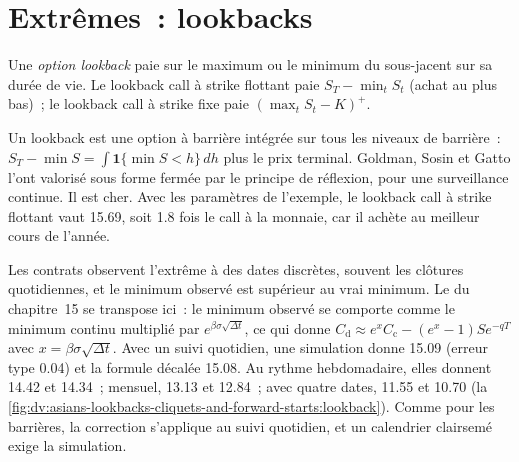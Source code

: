 \section{Extrêmes~: lookbacks}

\begin{definition}\label{def:dv:asians-lookbacks-cliquets-and-forward-starts:lookback}
Une \emph{option lookback} paie sur le maximum ou le minimum du sous-jacent sur sa durée de vie. Le
lookback call à strike flottant paie $S_T-\min_tS_t$ (achat au plus bas)~; le lookback call à strike fixe paie
$(\max_tS_t-K)^+$.
\end{definition}

Un lookback est une option à barrière intégrée sur tous les niveaux de barrière~: $S_T-\min S=\int\mathbf 1\{\min S<h\}\,dh$ plus
le prix terminal. Goldman, Sosin et Gatto l'ont valorisé sous forme fermée par le principe de réflexion, pour une surveillance
continue. Il est cher. Avec les paramètres de l'exemple, le lookback call à strike flottant vaut 15.69, soit 1.8 fois le
call à la monnaie, car il achète au meilleur cours de l'année.

Les contrats observent l'extrême à des dates discrètes, souvent les clôtures quotidiennes, et le minimum observé est supérieur au vrai
minimum. Le  du chapitre~15 se transpose ici~: le minimum observé se comporte comme le minimum continu multiplié par
$e^{\beta\sigma\sqrt{\Delta t}}$, ce qui donne $C_{\mathrm d}\approx e^{x}C_{\mathrm c}-(e^x-1)Se^{-qT}$ avec
$x=\beta\sigma\sqrt{\Delta t}$. Avec un suivi quotidien, une simulation donne 15.09 (erreur type 0.04) et la formule décalée
15.08. Au rythme hebdomadaire, elles donnent 14.42 et 14.34~; mensuel, 13.13 et 12.84~; avec quatre dates, 11.55 et 10.70
(la \cref{fig:dv:asians-lookbacks-cliquets-and-forward-starts:lookback}). Comme pour les barrières, la correction s'applique au
suivi quotidien, et un calendrier clairsemé exige la simulation.

